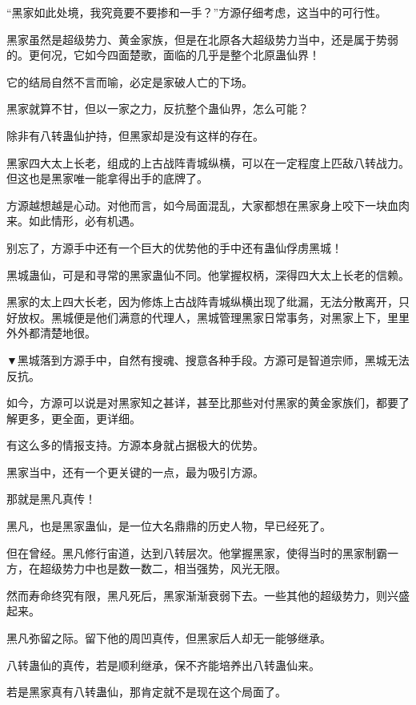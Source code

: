 
\begin{this_body}

“黑家如此处境，我究竟要不要掺和一手？”方源仔细考虑，这当中的可行性。

黑家虽然是超级势力、黄金家族，但是在北原各大超级势力当中，还是属于势弱的。更何况，它如今四面楚歌，面临的几乎是整个北原蛊仙界！

它的结局自然不言而喻，必定是家破人亡的下场。

黑家就算不甘，但以一家之力，反抗整个蛊仙界，怎么可能？

除非有八转蛊仙护持，但黑家却是没有这样的存在。

黑家四大太上长老，组成的上古战阵青城纵横，可以在一定程度上匹敌八转战力。但这也是黑家唯一能拿得出手的底牌了。

方源越想越是心动。对他而言，如今局面混乱，大家都想在黑家身上咬下一块血肉来。如此情形，必有机遇。

别忘了，方源手中还有一个巨大的优势他的手中还有蛊仙俘虏黑城！

黑城蛊仙，可是和寻常的黑家蛊仙不同。他掌握权柄，深得四大太上长老的信赖。

黑家的太上四大长老，因为修炼上古战阵青城纵横出现了纰漏，无法分散离开，只好放权。黑城便是他们满意的代理人，黑城管理黑家日常事务，对黑家上下，里里外外都清楚地很。

▼黑城落到方源手中，自然有搜魂、搜意各种手段。方源可是智道宗师，黑城无法反抗。

如今，方源可以说是对黑家知之甚详，甚至比那些对付黑家的黄金家族们，都要了解更多，更全面，更详细。

有这么多的情报支持。方源本身就占据极大的优势。

黑家当中，还有一个更关键的一点，最为吸引方源。

那就是黑凡真传！

黑凡，也是黑家蛊仙，是一位大名鼎鼎的历史人物，早已经死了。

但在曾经。黑凡修行宙道，达到八转层次。他掌握黑家，使得当时的黑家制霸一方，在超级势力中也是数一数二，相当强势，风光无限。

然而寿命终究有限，黑凡死后，黑家渐渐衰弱下去。一些其他的超级势力，则兴盛起来。

黑凡弥留之际。留下他的周凹真传，但黑家后人却无一能够继承。

八转蛊仙的真传，若是顺利继承，保不齐能培养出八转蛊仙来。

若是黑家真有八转蛊仙，那肯定就不是现在这个局面了。


\end{this_body}
